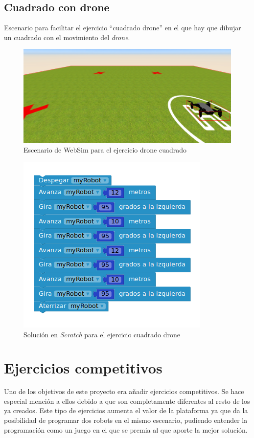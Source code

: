 \subsection{Cuadrado con drone}

Escenario para facilitar el ejercicio ``cuadrado drone'' en el que hay que dibujar un cuadrado con el movimiento del \textit{drone}.
    
    \begin{figure}[H]
        \centering
        \includegraphics[scale=0.4]{img/cuadradoDrone.png}
        \caption{Escenario de WebSim para el ejercicio drone cuadrado} 
        \label{fig:droneCuadrado}
    \end{figure}

    \begin{figure}[H]
    \centering
    \includegraphics[scale=0.4]{img/tellocuadradocodigo.png}
    \caption{Solución en \textit{Scratch} para el ejercicio cuadrado drone} 
    \label{fig:cuadradoSolution}
    \end{figure}
    
\section{Ejercicios competitivos}
\label{sec:competitive}
Uno de los objetivos de este proyecto era añadir ejercicios competitivos. Se hace especial mención a ellos debido a que son completamente diferentes al resto de los ya creados. Este tipo de ejercicios aumenta el valor de la plataforma ya que da la posibilidad de programar dos robots en el mismo escenario, pudiendo entender la programación como un juego en el que se premia al que aporte la mejor solución.

